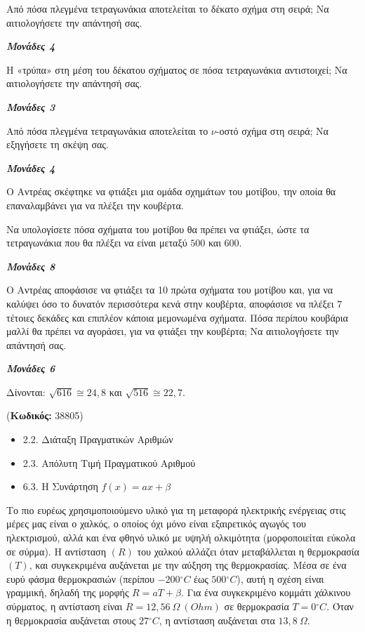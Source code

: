 \documentclass[11pt,a4paper,twoside]{book}
\newcounter{askhsh}[chapter]
\renewcommand{\theaskhsh}{
	\bf{\titlefont{\Large{\thechapter}}.\arabic{askhsh}}
}
\newcommand{\Askhsh}[2]{\refstepcounter{askhsh}{\titlefont{Άσκηση\theaskhsh} - \textcolor{maincolor}{ΘΕΜΑ #2}} ({\small{\textbf{Κωδικός:} #1}})\\}{}
\newenvironment{ylh}{
\begin{tcolorbox}[
breakable,
enhanced standard,
titlerule=0pt,
toprule=0pt, 
rightrule=0pt, 
bottomrule=0pt,
title={\titlefont Ύλη άσκησης},
colback=white,
opacityback=0,
left=2mm,
top=1mm,
bottom=0mm,
boxrule=0pt,
colframe=white,
borderline west={1.5mm}{0pt}{secondarycolor},
leftrule=2mm,
sharp corners,
coltitle=black
]
\begin{itemize}[leftmargin=3mm, itemsep=0mm, label=\textcolor{secondarycolor}{{\small\faBook}}]
}{
\end{itemize}
\end{tcolorbox}
}
\newcommand{\monades}[1]{
\hspace*{\fill}
\textbf{\textit{\textcolor{maincolor}{Μονάδες #1}}}}
\begin{document}
\begin{alist}
\item

\begin{rlist}
\item Από πόσα πλεγμένα τετραγωνάκια αποτελείται το δέκατο σχήμα στη σειρά; Να αιτιολογήσετε την απάντησή σας.
\monades{4}
\item Η «τρύπα» στη μέση του δέκατου σχήματος σε πόσα τετραγωνάκια αντιστοιχεί; Να αιτιολογήσετε την απάντησή σας.
\monades{3}
\end{rlist}
\item Από πόσα πλεγμένα τετραγωνάκια αποτελείται το $\nu$-οστό σχήμα στη σειρά; Να εξηγήσετε τη σκέψη σας.
\monades{4}
\item Ο Αντρέας σκέφτηκε να φτιάξει μια ομάδα σχημάτων του μοτίβου, την οποία θα επαναλαμβάνει για να πλέξει την κουβέρτα.

\begin{rlist}
\item Να υπολογίσετε πόσα σχήματα του μοτίβου θα πρέπει να φτιάξει, ώστε τα τετραγωνάκια που θα πλέξει να είναι μεταξύ $500$ και $600$.
\monades{8}
\item Ο Αντρέας αποφάσισε να φτιάξει τα 10 πρώτα σχήματα του μοτίβου και, για να καλύψει όσο το δυνατόν περισσότερα κενά στην κουβέρτα, αποφάσισε να πλέξει $7$ τέτοιες δεκάδες και επιπλέον κάποια μεμονωμένα σχήματα. Πόσα περίπου κουβάρια μαλλί θα πρέπει να αγοράσει, για να φτιάξει την κουβέρτα; Να αιτιολογήσετε την απάντησή σας.
\monades{6}

Δίνονται: $\sqrt{616} \cong 24{,}8$ και $\sqrt{516} \cong 22{,}7$.
\end{rlist}
\end{alist}

\vspace{4mm}
\Askhsh{38805}{4}
\begin{ylh}
    \item 2.2. Διάταξη Πραγματικών Αριθμών
    \item 2.3. Απόλυτη Τιμή Πραγματικού Αριθμού
    \item 6.3. Η Συνάρτηση $f(x)=ax+\beta$
\end{ylh}

Το πιο ευρέως χρησιμοποιούμενο υλικό για τη μεταφορά ηλεκτρικής ενέργειας στις μέρες μας είναι ο χαλκός, ο οποίος όχι μόνο είναι εξαιρετικός αγωγός του ηλεκτρισμού, αλλά και ένα φθηνό υλικό με υψηλή ολκιμότητα (μορφοποιείται εύκολα σε σύρμα). Η αντίσταση $(R)$ του χαλκού αλλάζει όταν μεταβάλλεται η θερμοκρασία $(T)$, και συγκεκριμένα αυξάνεται με την αύξηση της θερμοκρασίας. Μέσα σε ένα ευρύ φάσμα θερμοκρασιών (περίπου $- 200{^\circ}C$ έως $500{^\circ}C$), αυτή η σχέση είναι γραμμική, δηλαδή της μορφής $R = a T + \beta$. Για ένα συγκεκριμένο κομμάτι χάλκινου σύρματος, η αντίσταση είναι $R = 12,56\ \Omega\ (Ohm)$ σε θερμοκρασία $T = 0{^\circ}C$. Όταν η θερμοκρασία αυξάνεται στους $27{^\circ}C$, η αντίσταση αυξάνεται στα $13,8\ \Omega$.
\end{document}
